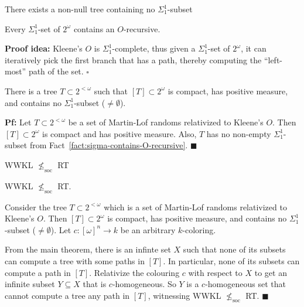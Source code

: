 \begin{frame}{There exists a non-null tree containing no $\Sigma_1^1$-subset}
  \begin{fact}
    \label{fact:sigma-contains-O-recursive}
    Every $\Sigma_1^1$-set of $2^\omega$ contains an $O$-recursive.
  \end{fact}
  \textbf{Proof idea:} Kleene's $O$ is $\Sigma_1^1$-complete, thus given a 
  $\Sigma_1^1$-set of $2^\omega$, it can iteratively pick the first branch
  that has a path, thereby computing the ``left-most'' path of the set.
  $\square$

  \vspace{1em}
  \begin{thm}
    There is a tree $T\subset2^{<\omega}$ such that $[T]\subset
    2^\omega$ is compact, has positive measure, and contains no
    $\Sigma_1^1$-subset ($\neq\emptyset$).
  \end{thm}
  \textbf{Pf:} Let $T\subset2^{<\omega}$ be a set of Martin-Lof randoms
  relativized to Kleene's $O$. Then $[T]\subset 2^\omega$ is compact and
  has positive measure. Also, $T$ has no non-empty $\Sigma_1^1$-subset from
  Fact~\ref{fact:sigma-contains-O-recursive}. $\blacksquare$
\end{frame}

\begin{frame}{WWKL $\nleq_{\text{soc}}$ RT}
  \begin{theorem}
    WWKL $\nleq_{\text{soc}}$ RT.
  \end{theorem}

  Consider the tree $T\subset2^{<\omega}$ which is a set of Martin-Lof
  randoms relativized to Kleene's $O$. Then $[T]\subset 2^\omega$ is
  compact, has positive measure, and contains no $\Sigma_1^1$-subset
  ($\neq\emptyset$). Let $c:[\omega]^n\rightarrow k$ be an arbitrary
  $k$-coloring.
  
  \vspace{1em}
  From the main theorem, there is an infinte set $X$ such that none of its
  subsets can compute a tree with some paths in $[T]$. In particular, none
  of its subsets can compute a path in $[T]$. Relativize the
  colouring $c$ with respect to $X$ to get an infinite subset $Y\subseteq
  X$ that is $c$-homogeneous. So $Y$ is a $c$-homogeneous set that cannot
  compute a tree any path in $[T]$, witnessing WWKL $\nleq_{\text{soc}}$
  RT. $\blacksquare$
\end{frame}
